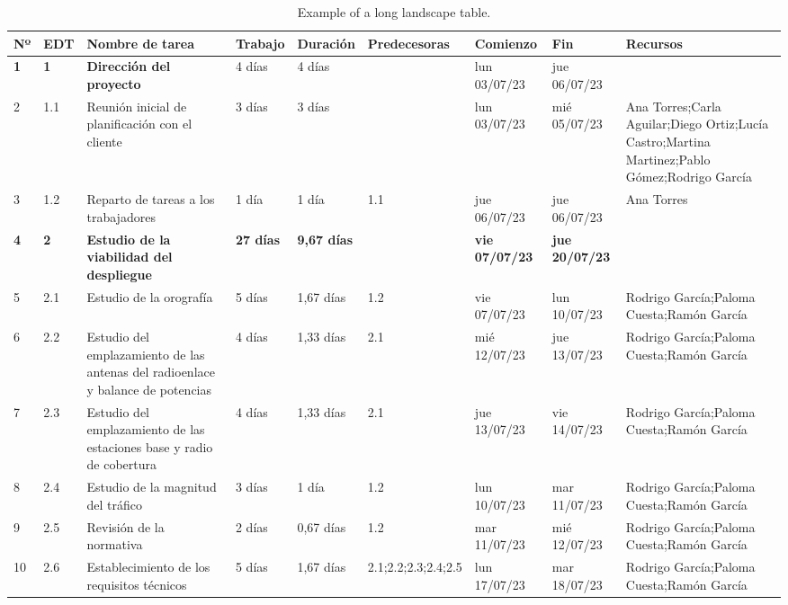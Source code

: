 \begin{landscape}
    \begin{table}[p]
    \footnotesize
    \centering
    \renewcommand{\arraystretch}{1.2}
    
    \caption{Example of a long landscape table.}
    \label{tab:predecesoras-1}
    \begin{tabular}{|l|l|p{5.5cm}|l|l|l|l|l|p{5.5cm}|}
    \hline
    \textbf{Nº} & \textbf{EDT} & \textbf{Nombre de tarea} & \textbf{Trabajo} & \textbf{Duración} & \textbf{Predecesoras} & \textbf{Comienzo} & \textbf{Fin} & \textbf{Recursos} \\ \hline\hline
    \textbf{1} & \textbf{1} & \textbf{Dirección del proyecto} & 4 días & 4 días &  & lun 03/07/23 & jue 06/07/23 &  \\ \hline
    2 & 1.1 & Reunión inicial de planificación con el cliente & 3 días & 3 días &  & lun 03/07/23 & mié 05/07/23 & Ana Torres;Carla Aguilar;Diego Ortiz;Lucía   Castro;Martina Martinez;Pablo Gómez;Rodrigo García \\ \hline
    3 & 1.2 & Reparto de tareas a los trabajadores & 1 día & 1 día & 1.1 & jue 06/07/23 & jue 06/07/23 & Ana Torres \\ \hline
    \textbf{4} & \textbf{2} & \textbf{Estudio de la viabilidad del despliegue} & \textbf{27 días} & \textbf{9,67 días} & \textbf{} & \textbf{vie 07/07/23} & \textbf{jue 20/07/23} & \textbf{} \\ \hline
    5 & 2.1 & Estudio de la orografía & 5 días & 1,67 días & 1.2 & vie 07/07/23 & lun 10/07/23 & Rodrigo García;Paloma Cuesta;Ramón García \\ \hline
    6 & 2.2 & Estudio del emplazamiento de las antenas del   radioenlace y balance de potencias & 4 días & 1,33 días & 2.1 & mié 12/07/23 & jue 13/07/23 & Rodrigo García;Paloma Cuesta;Ramón García \\ \hline
    7 & 2.3 & Estudio del emplazamiento de las estaciones   base y radio de cobertura & 4 días & 1,33 días & 2.1 & jue 13/07/23 & vie 14/07/23 & Rodrigo García;Paloma Cuesta;Ramón García \\ \hline
    8 & 2.4 & Estudio de la magnitud del tráfico & 3 días & 1 día & 1.2 & lun 10/07/23 & mar 11/07/23 & Rodrigo García;Paloma Cuesta;Ramón García \\ \hline
    9 & 2.5 & Revisión de la normativa & 2 días & 0,67 días & 1.2 & mar 11/07/23 & mié 12/07/23 & Rodrigo García;Paloma Cuesta;Ramón García \\ \hline
    10 & 2.6 & Establecimiento de los requisitos técnicos & 5 días & 1,67 días & 2.1;2.2;2.3;2.4;2.5 & lun 17/07/23 & mar 18/07/23 & Rodrigo García;Paloma Cuesta;Ramón García \\ \hline

\end{tabular}
\end{table}
\end{landscape}
